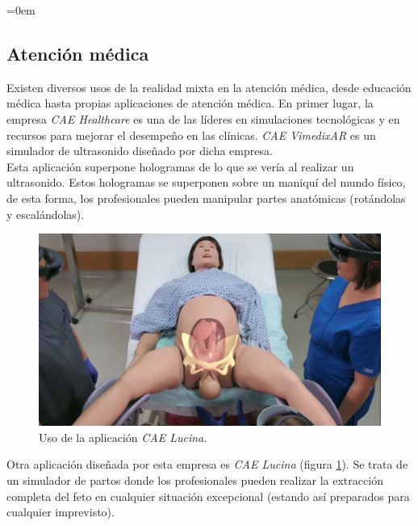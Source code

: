 \parindent=0em
\subsection{Atención médica}
\noindent


Existen diversos usos de la realidad mixta en la atención médica, desde educación médica hasta propias aplicaciones de atención médica. En primer lugar, la empresa \textit{CAE Healthcare} es una de las líderes en simulaciones tecnológicas y en recursos para mejorar el desempeño en las clínicas. \textit{CAE VimedixAR} es un simulador de ultrasonido diseñado por dicha empresa. \\

Esta aplicación superpone hologramas de lo que se vería al realizar un ultrasonido. Estos hologramas se superponen sobre un maniquí del mundo físico, de esta forma, los profesionales pueden manipular partes anatómicas (rotándolas y escalándolas).\\

\begin{figure}[H]
    \centering
    \includegraphics[scale=0.35]{Images/Estado del arte/caehealthcareparto.jpg}
    \caption[Uso de la aplicación \textit{CAE Lucina}]{Uso de la aplicación \textit{CAE Lucina}\footnotemark.}
    \label{fig:caelucina}
\end{figure}

Otra aplicación diseñada por esta empresa es \textit{CAE Lucina} (figura \ref{fig:caelucina}). Se trata de un simulador de partos donde los profesionales pueden realizar la extracción completa del feto en cualquier situación excepcional (estando así preparados para cualquier imprevisto).\\



